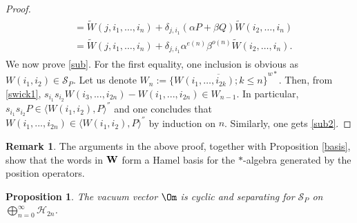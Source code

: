 \documentclass[12pt]{amsart}
\numberwithin{equation}{section}
\def\ch{{\mathcal H}}
\def\a{\alpha}
\def\b{\beta}
\def\d{\delta}  \def\D{\Delta}
\newtheorem{prop}[thm]{Proposition}
\theoremstyle{definition}
\newtheorem{rem}[thm]{Remark}
\begin{document}
\begin{proof}
\begin{align}
\begin{split}
&=\widetilde{W}(j,i_1,\ldots,i_n)+\d_{j,i_1}(\a P+\b Q)\widetilde{W}(i_2,\ldots,i_n)\\
&=\widetilde{W}(j,i_1,\ldots,i_n)+\d_{j,i_1}\a^{e(n)}\b^{o(n)}\widetilde{W}(i_2,\ldots,i_n).
\end{split}
\end{align}
We now prove \eqref{sub}. For the first equality, one inclusion is
obvious as $W(i_1,i_2)\in \mathcal{S}_P$. Let us denote
$W_n:=\overline{\{W(i_1,\ldots, i_{2k});k\leq n\}}^{w*}$. Then, from
\eqref{swick1},
$s_{i_1}s_{i_2}W(i_3,...,i_{2n})-W(i_1,...,i_{2n})\in W_{n-1}$. In
particular, $s_{i_1}s_{i_2}P\in \langle W(i_1,i_2),P\rangle^{''}$ and one
concludes that
$W(i_1,...,i_{2n})\in \langle W(i_1,i_2),P\rangle^{''}$ by induction on $n$. Similarly, one gets \eqref{sub2}.
\end{proof}

\begin{rem}
The arguments in the above proof, together with Proposition \ref{basis}, show that the words in $\bf{W}$ form a Hamel basis for the $*$-algebra generated by the position operators.
\end{rem}

\begin{prop}\label{sep}
The vacuum vector $\Om$ is cyclic and separating for $\mathcal{S}_P$ on $\bigoplus_{n=0}^{\infty} \ch_{2n}$.
\end{prop}
\end{document}
